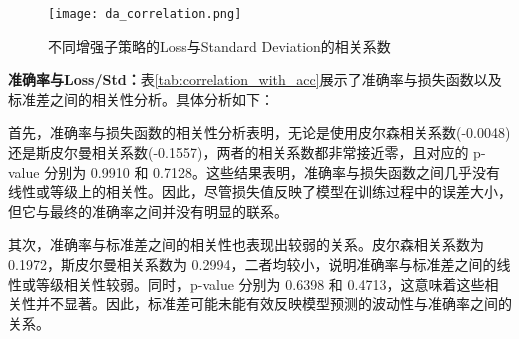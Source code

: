 \documentclass[master]{thesis-uestc}
\begin{document}
\begin{figure}[h]
    \centering
    \texttt{[image: da\_correlation.png]}
    \caption{不同增强子策略的Loss与Standard Deviation的相关系数}
    \label{correlation_with_loss_std}
\end{figure}
\textbf{准确率与Loss/Std：}表\ref{tab:correlation_with_acc}展示了准确率与损失函数以及标准差之间的相关性分析。具体分析如下：

首先，准确率与损失函数的相关性分析表明，无论是使用皮尔森相关系数(-0.0048)还是斯皮尔曼相关系数(-0.1557)，两者的相关系数都非常接近零，且对应的 p-value 分别为 0.9910 和 0.7128。这些结果表明，准确率与损失函数之间几乎没有线性或等级上的相关性。因此，尽管损失值反映了模型在训练过程中的误差大小，但它与最终的准确率之间并没有明显的联系。

其次，准确率与标准差之间的相关性也表现出较弱的关系。皮尔森相关系数为 0.1972，斯皮尔曼相关系数为 0.2994，二者均较小，说明准确率与标准差之间的线性或等级相关性较弱。同时，p-value 分别为 0.6398 和 0.4713，这意味着这些相关性并不显著。因此，标准差可能未能有效反映模型预测的波动性与准确率之间的关系。
\end{document}
